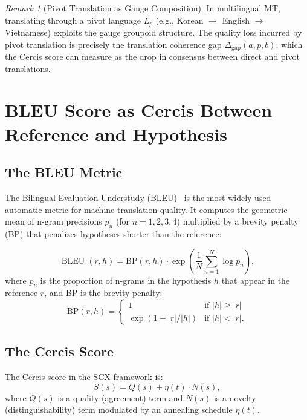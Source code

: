 \documentclass[12pt,a4paper]{article}
\theoremstyle{remark}
\newtheorem{remark}[theorem]{Remark}
\newcommand{\SCX}{\textsf{SCX}}
\newcommand{\Cercis}{\textsf{Cercis}}
\DeclareMathOperator{\BLEU}{BLEU}
\begin{document}
\begin{remark}[Pivot Translation as Gauge Composition]
\label{rem:pivot}
In multilingual MT, translating through a pivot language $L_p$
(e.g., Korean $\to$ English $\to$ Vietnamese) exploits the
gauge groupoid structure. The quality loss incurred by pivot
translation is precisely the translation coherence gap
$\Delta_{\text{gap}}(a,p,b)$, which the \Cercis{} score can
measure as the drop in consensus between direct and pivot
translations.
\end{remark}


\section{BLEU Score as Cercis Between Reference and Hypothesis}
\label{sec:bleu_cercis}

\subsection{The BLEU Metric}

The Bilingual Evaluation Understudy (BLEU)~\cite{papineni2002bleu} is the
most widely used automatic metric for machine translation quality. It
computes the geometric mean of n-gram precisions $p_n$ (for $n = 1, 2, 3, 4$)
multiplied by a brevity penalty (BP) that penalizes hypotheses shorter than
the reference:

\begin{equation}
  \label{eq:bleu}
  \BLEU(r, h) = \text{BP}(r, h) \cdot \exp\left(\frac{1}{N}\sum_{n=1}^N \log p_n\right),
\end{equation}
where $p_n$ is the proportion of n-grams in the hypothesis $h$ that appear
in the reference $r$, and BP is the brevity penalty:
\begin{equation}
  \text{BP}(r, h) = \begin{cases}
    1 & \text{if } |h| \geq |r| \\
    \exp(1 - |r|/|h|) & \text{if } |h| < |r|.
  \end{cases}
\end{equation}

\subsection{The Cercis Score}

The \Cercis{} score in the \SCX{} framework is:
\begin{equation}
  \label{eq:cercis_general}
  S(s) = Q(s) + \eta(t) \cdot N(s),
\end{equation}
where $Q(s)$ is a quality (agreement) term and $N(s)$ is a novelty
(distinguishability) term modulated by an annealing schedule $\eta(t)$.
\end{document}
